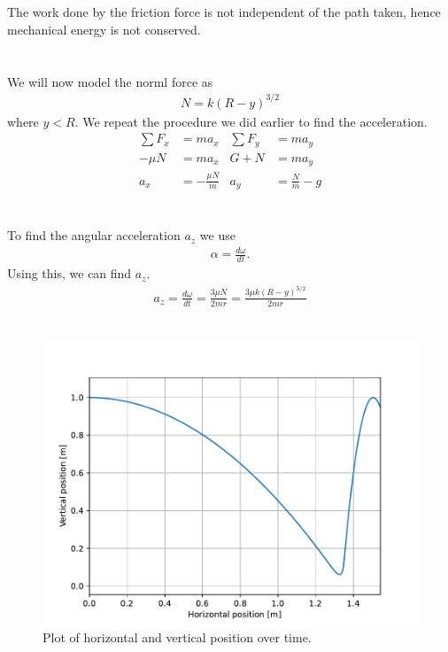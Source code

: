 \documentclass[a4paper,10pt,english]{article}
\begin{document}
\section{} \label{f}
The work done by the friction force is not independent of the path taken, hence mechanical energy is not conserved.

\section{} \label{g}
We will now model the norml force as 
\begin{align}
	N = k (R - y)^{3/2}
\end{align}
where $y < R$. We repeat the procedure we did earlier to find the acceleration.
\begin{align*}
	\sum F_x &= m a_x 		& 	\sum F_y &= m a_y \\
	-\mu N &= m a_x 		& 	G + N &= m a_y \\
	a_x &= -\frac{\mu N}{m} & 	a_y &= \frac{N}{m} - g
\end{align*}

\section{} \label{h}
To find the angular acceleration $a_z$ we use
\begin{align}
	\alpha = \frac{d \omega}{dt}.
\end{align}
Using this, we can find $a_z$.
\begin{align*}
	a_z = \frac{d \omega}{dt} = \frac{3 \mu N}{2 m r} = \frac{3 \mu k (R-y)^{3/2}}{2 m r}
\end{align*}

\newpage

\section{} \label{i}


\begin{figure}[h!]
	\centering
	\includegraphics[scale=0.7]{position.pdf}
	\caption{Plot of horizontal and vertical position over time.}
	\label{fig:dist}
\end{figure}
\end{document}
